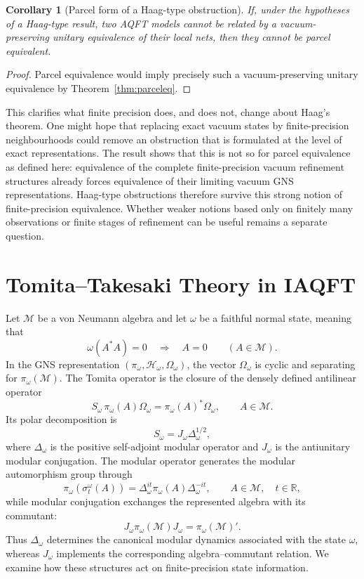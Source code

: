\documentclass[11pt]{article}
\newtheorem{corollary}[theorem]{Corollary}
\begin{document}
\begin{corollary}[Parcel form of a Haag-type obstruction]
\label{thm:haag}
If, under the hypotheses of a Haag-type result, two AQFT models cannot be
related by a vacuum-preserving unitary equivalence of their local nets,
then they cannot be parcel equivalent.
\end{corollary}

\begin{proof}
Parcel equivalence would imply precisely such a vacuum-preserving unitary
equivalence by Theorem~\ref{thm:parceleq}.
\end{proof}

This clarifies what finite precision does, and does not, change about
Haag's theorem. One might hope that replacing exact vacuum states by
finite-precision neighbourhoods could remove an obstruction that is
formulated at the level of exact representations. The result shows that
this is not so for parcel equivalence as defined here: equivalence of the
complete finite-precision vacuum refinement structures already forces
equivalence of their limiting vacuum GNS representations. Haag-type
obstructions therefore survive this strong notion of finite-precision
equivalence. Whether weaker notions based only on finitely many
observations or finite stages of refinement can be useful remains a
separate question.

\section{Tomita--Takesaki Theory in IAQFT}
\label{sec:modular}
Let $\mathcal M$ be a von Neumann algebra and let $\omega$ be a faithful
normal state, meaning that
\[
\omega(A^*A)=0
\quad\Longrightarrow\quad
A=0
\qquad(A\in\mathcal M).
\]
In the GNS representation
$(\pi_\omega,\mathcal H_\omega,\Omega_\omega)$, the vector
$\Omega_\omega$ is cyclic and separating for $\pi_\omega(\mathcal M)$.
The Tomita operator is the closure of the densely defined antilinear
operator
\[
S_\omega\,
\pi_\omega(A)\Omega_\omega
=
\pi_\omega(A)^*\Omega_\omega,
\qquad A\in\mathcal M.
\]
Its polar decomposition is
\[
S_\omega
=
J_\omega\Delta_\omega^{1/2},
\]
where $\Delta_\omega$ is the positive self-adjoint modular operator and
$J_\omega$ is the antiunitary modular conjugation. The modular operator
generates the modular automorphism group through
\[
\pi_\omega\!\left(\sigma_t^\omega(A)\right)
=
\Delta_\omega^{it}\pi_\omega(A)\Delta_\omega^{-it},
\qquad
A\in\mathcal M,\quad t\in\mathbb R,
\]
while modular conjugation exchanges the represented algebra with its
commutant:
\[
J_\omega\pi_\omega(\mathcal M)J_\omega
=
\pi_\omega(\mathcal M)'.
\]
Thus $\Delta_\omega$ determines the canonical modular dynamics associated
with the state $\omega$, whereas $J_\omega$ implements the corresponding
algebra--commutant relation. We examine how these structures act on
finite-precision state information.
\end{document}
